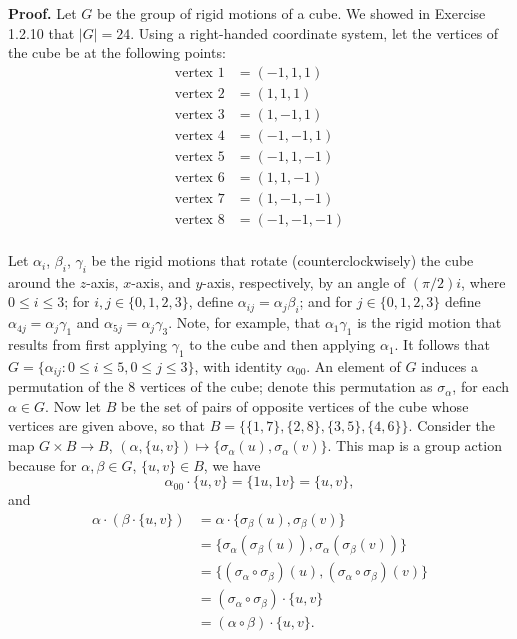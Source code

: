 \begin{enumerate}
      \textbf{Proof.} Let $G$ be the group of rigid motions of a cube. We showed
      in Exercise 1.2.10 that $|G| = 24$. Using a right-handed coordinate
      system, let the vertices of the cube be at the following points:
      \begin{align*}
         \text{vertex 1} &= (-1, 1, 1) \\
         \text{vertex 2} &= (1, 1, 1) \\
         \text{vertex 3} &= (1, -1, 1) \\
         \text{vertex 4} &= (-1, -1, 1) \\
         \text{vertex 5} &= (-1, 1, -1) \\
         \text{vertex 6} &= (1, 1, -1) \\
         \text{vertex 7} &= (1, -1, -1) \\
         \text{vertex 8} &= (-1, -1, -1) \\
      \end{align*} 

      Let $\alpha_i$, $\beta_i$, $\gamma_i$ be the rigid motions that rotate 
      (counterclockwisely) the cube around the $z$-axis, $x$-axis, and $y$-axis,
      respectively, by an angle of $(\pi/2)i$, where $0 \le i \le 3$; for
      $i, j \in \{0, 1, 2, 3\}$, define $\alpha_{ij} = \alpha_{j}\beta_i$; and
      for $j \in \{0, 1, 2, 3\}$ define $\alpha_{4j} = \alpha_{j}\gamma_1$ and
      $\alpha_{5j} = \alpha_{j}\gamma_3$. Note, for example, that
      $\alpha_1\gamma_1$ is the rigid motion that results from first applying
      $\gamma_1$ to the cube and then applying $\alpha_1$. It follows that
      $G = \{\alpha_{ij} : 0 \le i \le 5, 0 \le j \le 3\}$, with identity
      $\alpha_{00}$. An element of $G$ induces a permutation of the 8 vertices
      of the cube; denote this permutation as $\sigma_\alpha$, for each
      $\alpha \in G$. Now let $B$ be the set of pairs of opposite vertices of
      the cube whose vertices are given above, so that
      $B = \{\{1, 7\}, \{2, 8\}, \{3, 5\}, \{4, 6\}\}$. Consider the map
      $G \times B \rightarrow B$,
      $(\alpha, \{u, v\}) \mapsto \{\sigma_\alpha(u), \sigma_\alpha(v)\}$. This
      map is a group action because for $\alpha, \beta \in G$, $\{u, v\} \in B$,
      we have
      $$\alpha_{00} \cdot \{u, v\} = \{1u, 1v\} = \{u, v\},$$
      and
      \begin{align*}
         \alpha \cdot (\beta \cdot \{u, v\}) &=
         \alpha \cdot \{\sigma_\beta(u), \sigma_\beta(v)\} \\
         &= \{\sigma_\alpha(\sigma_\beta(u)), \sigma_\alpha(\sigma_\beta(v))\}\\
         &= \{(\sigma_\alpha\circ\sigma_\beta)(u),
              (\sigma_\alpha\circ\sigma_\beta)(v)\} \\
                     &= (\sigma_\alpha\circ\sigma_\beta) \cdot \{u, v\} \\
                     &= (\alpha\circ\beta) \cdot \{u, v\}.
      \end{align*}


\end{enumerate}
